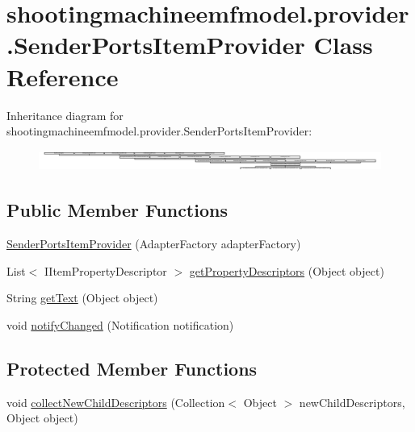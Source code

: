 \hypertarget{classshootingmachineemfmodel_1_1provider_1_1_sender_ports_item_provider}{\section{shootingmachineemfmodel.\-provider.\-Sender\-Ports\-Item\-Provider Class Reference}
\label{classshootingmachineemfmodel_1_1provider_1_1_sender_ports_item_provider}
}
Inheritance diagram for shootingmachineemfmodel.\-provider.\-Sender\-Ports\-Item\-Provider\-:\begin{figure}[H]
\begin{center}
\leavevmode
\includegraphics[height=0.680603cm]{classshootingmachineemfmodel_1_1provider_1_1_sender_ports_item_provider}
\end{center}
\end{figure}
\subsection*{Public Member Functions}
\begin{DoxyCompactItemize}
\item 
\hyperlink{classshootingmachineemfmodel_1_1provider_1_1_sender_ports_item_provider_a9d4be090f0c774a176ef02c09eadf37c}{Sender\-Ports\-Item\-Provider} (Adapter\-Factory adapter\-Factory)
\item 
List$<$ I\-Item\-Property\-Descriptor $>$ \hyperlink{classshootingmachineemfmodel_1_1provider_1_1_sender_ports_item_provider_a3a6458c606a59ce7f511f8fa02a2c5d1}{get\-Property\-Descriptors} (Object object)
\item 
String \hyperlink{classshootingmachineemfmodel_1_1provider_1_1_sender_ports_item_provider_a21c86177325dec6bcae2dce7ad60509f}{get\-Text} (Object object)
\item 
void \hyperlink{classshootingmachineemfmodel_1_1provider_1_1_sender_ports_item_provider_a82f0a3f39860279e4019e83c6b525e56}{notify\-Changed} (Notification notification)
\end{DoxyCompactItemize}
\subsection*{Protected Member Functions}
\begin{DoxyCompactItemize}
\item 
void \hyperlink{classshootingmachineemfmodel_1_1provider_1_1_sender_ports_item_provider_a75cb51510106333393c0719a2ad63acc}{collect\-New\-Child\-Descriptors} (Collection$<$ Object $>$ new\-Child\-Descriptors, Object object)
\end{DoxyCompactItemize}


